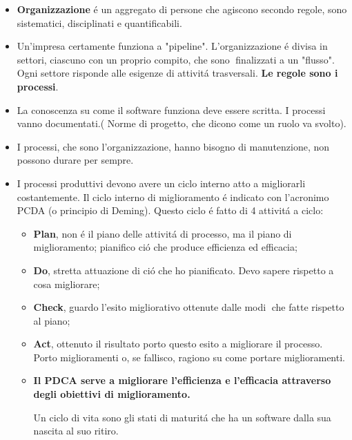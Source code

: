 \documentclass[10pt]{article}
\begin{document}
\begin{itemize}
	\item \textbf{Organizzazione} \'e un aggregato di persone che 
	agiscono secondo regole, sono sistematici, disciplinati e
	quantificabili. 
	
	\item Un'impresa certamente funziona a "pipeline". L'organizzazione \'e 
	divisa in settori, ciascuno con un proprio compito, che sono finalizzati a 
	un 
"flusso". Ogni settore risponde alle esigenze di attivit\'a 
	trasversali. \textbf{Le regole sono i processi}. 
	
	\item La conoscenza su come il software funziona deve essere scritta. I 
	processi vanno documentati.( Norme di progetto, che dicono come un ruolo va 
	svolto).

	\item I processi, che sono l'organizzazione, hanno bisogno di manutenzione, 
	non possono durare per sempre.
	 
	\item I processi produttivi devono avere un ciclo interno atto a 
	migliorarli 
	costantemente. Il ciclo interno di miglioramento \'e indicato con 
	l'acronimo 
	PCDA (o principio di Deming). 
	Questo ciclo \'e fatto di 4 attivit\'a a ciclo:
	\begin{itemize}
		\item \textbf{Plan}, non \'e il piano delle attivit\'a di processo, ma 
		il
		piano di miglioramento; pianifico ci\'o che produce
		efficienza ed efficacia;
		
		\item \textbf{Do}, stretta attuazione di ci\'o che ho pianificato. Devo 
		sapere rispetto a cosa migliorare;
		
		\item \textbf{Check}, guardo l'esito migliorativo ottenute dalle modi
		che fatte rispetto al piano;
		
		\item \textbf{Act}, ottenuto il risultato porto questo esito a 
		migliorare il processo. 
		Porto miglioramenti o, se fallisco, ragiono su come portare 
		miglioramenti.
		
		
		\item \textbf{Il PDCA serve a migliorare l'efficienza e l'efficacia 
		attraverso degli obiettivi di miglioramento.}
		
		Un ciclo di vita sono gli stati di maturit\'a che ha un software dalla 
		sua nascita al suo ritiro.
		
	\end{itemize}


\end{itemize}
\end{document}
